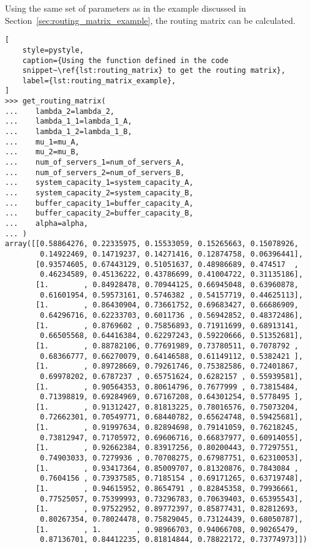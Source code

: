 Using the same set of parameters as in the example discussed in
Section~\ref{sec:routing_matrix_example}, the routing matrix can be calculated.

\newpage

\begin{lstlisting}[
    style=pystyle,
    caption={Using the function defined in the code
    snippet~\ref{lst:routing_matrix} to get the routing matrix},
    label={lst:routing_matrix_example},
]
>>> get_routing_matrix(
...    lambda_2=lambda_2,
...    lambda_1_1=lambda_1_A,
...    lambda_1_2=lambda_1_B,
...    mu_1=mu_A,
...    mu_2=mu_B,
...    num_of_servers_1=num_of_servers_A,
...    num_of_servers_2=num_of_servers_B,
...    system_capacity_1=system_capacity_A,
...    system_capacity_2=system_capacity_B,
...    buffer_capacity_1=buffer_capacity_A,
...    buffer_capacity_2=buffer_capacity_B,
...    alpha=alpha,
... )
array([[0.58864276, 0.22335975, 0.15533059, 0.15265663, 0.15078926,
        0.14922469, 0.14719237, 0.14271416, 0.12874758, 0.06396441],
       [0.93574605, 0.67443129, 0.51051637, 0.48986689, 0.474517  ,
        0.46234589, 0.45136222, 0.43786699, 0.41004722, 0.31135186],
       [1.        , 0.84928478, 0.70944125, 0.66945048, 0.63960878,
        0.61601954, 0.59573161, 0.5746382 , 0.54157719, 0.44625113],
       [1.        , 0.86430904, 0.73661752, 0.69683427, 0.66686909,
        0.64296716, 0.62233703, 0.6011736 , 0.56942852, 0.48372486],
       [1.        , 0.8769602 , 0.75856893, 0.71911699, 0.68913141,
        0.66505568, 0.64416384, 0.62297243, 0.59220666, 0.51352681],
       [1.        , 0.88782106, 0.77691989, 0.73780511, 0.7078792 ,
        0.68366777, 0.66270079, 0.64146588, 0.61149112, 0.5382421 ],
       [1.        , 0.89728669, 0.79261746, 0.75382586, 0.72401867,
        0.69978202, 0.6787237 , 0.65751624, 0.6282157 , 0.55939581],
       [1.        , 0.90564353, 0.80614796, 0.7677999 , 0.73815484,
        0.71398819, 0.69284969, 0.67167208, 0.64301254, 0.5778495 ],
       [1.        , 0.91312427, 0.81813225, 0.78016576, 0.75073204,
        0.72662301, 0.70549771, 0.68440782, 0.65624748, 0.59425681],
       [1.        , 0.91997634, 0.82894698, 0.79141059, 0.76218245,
        0.73812947, 0.71705972, 0.69606716, 0.66837977, 0.60914055],
       [1.        , 0.92662384, 0.83917256, 0.80200443, 0.77297551,
        0.74903033, 0.7279936 , 0.70708275, 0.67987751, 0.62310053],
       [1.        , 0.93417364, 0.85009707, 0.81320876, 0.7843084 ,
        0.7604156 , 0.73937585, 0.7185154 , 0.69171265, 0.63719748],
       [1.        , 0.94615952, 0.8654791 , 0.82845358, 0.79936661,
        0.77525057, 0.75399993, 0.73296783, 0.70639403, 0.65395543],
       [1.        , 0.97522952, 0.89772397, 0.85877431, 0.82812693,
        0.80267354, 0.78024478, 0.75829045, 0.73124439, 0.68050787],
       [1.        , 1.        , 0.98966703, 0.94066708, 0.90265479,
        0.87136701, 0.84412235, 0.81814844, 0.78822172, 0.73774973]])

\end{lstlisting}



